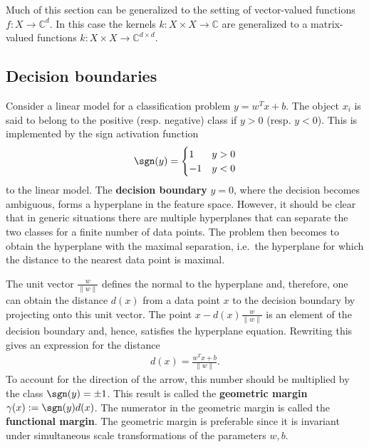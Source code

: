     \begin{remark}
        Much of this section can be generalized to the setting of vector-valued functions $f:X\rightarrow\mathbb{C}^d$. In this case the kernels $k:X\times X\rightarrow\mathbb{C}$ are generalized to a matrix-valued functions $k:X\times X\rightarrow\mathbb{C}^{d\times d}$.
    \end{remark}

\subsection{Decision boundaries}

    Consider a linear model for a classification problem $y = w^Tx + b$. The object $x_i$ is said to belong to the positive (resp. negative) class if $y>0$ (resp. $y<0$). This is implemented by the sign activation function
    \begin{gather}
        \sgn(y) =
        \begin{cases}
            1&y>0\\
            -1&y<0
        \end{cases}
    \end{gather}
    to the linear model. The \textbf{decision boundary} $y=0$, where the decision becomes ambiguous, forms a hyperplane in the feature space. However, it should be clear that in generic situations there are multiple hyperplanes that can separate the two classes for a finite number of data points. The problem then becomes to obtain the hyperplane with the maximal separation, i.e.~the hyperplane for which the distance to the nearest data point is maximal.

    The unit vector $\frac{w}{\|w\|}$ defines the normal to the hyperplane and, therefore, one can obtain the distance $d(x)$ from a data point $x$ to the decision boundary by projecting onto this unit vector. The point $x - d(x)\frac{w}{\|w\|}$ is an element of the decision boundary and, hence, satisfies the hyperplane equation. Rewriting this gives an expression for the distance
    \begin{gather}
        d(x) = \frac{w^Tx + b}{\|w\|}.
    \end{gather}
    To account for the direction of the arrow, this number should be multiplied by the class $\sgn(y)=\pm1$. This result is called the \textbf{geometric margin} $\gamma(x):=\sgn(y)d(x)$. The numerator in the geometric margin is called the \textbf{functional margin}. The geometric margin is preferable since it is invariant under simultaneous scale transformations of the parameters $w,b$.

